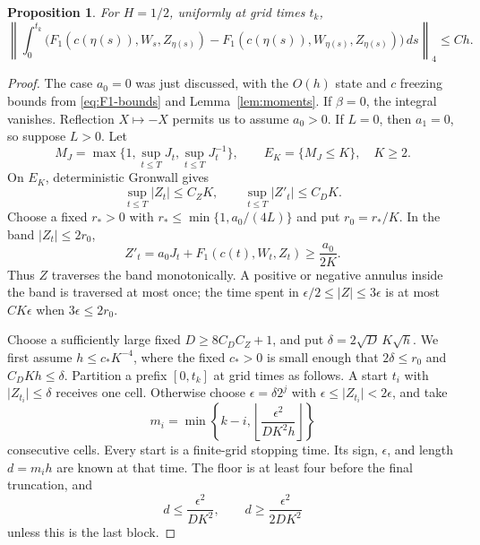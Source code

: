 \documentclass[11pt]{article}
\newtheorem{proposition}[theorem]{Proposition}
\theoremstyle{remark}
\newcommand{\abs}[1]{\lvert#1\rvert}
\begin{document}
\begin{proposition}\label{prop:Brownian-Q}
For \(H=1/2\), uniformly at grid times \(t_k\),
\begin{equation}\label{eq:Brownian-Q}
 \left\|\int_0^{t_k}
 \bigl(F_1(c(\eta(s)),W_s,Z_{\eta(s)})
       -F_1(c(\eta(s)),W_{\eta(s)},Z_{\eta(s)})\bigr)\,ds
 \right\|_4\le Ch .
\end{equation}
\end{proposition}
\begin{proof}
The case \(a_0=0\) was just discussed, with the \(O(h)\) state and
\(c\) freezing bounds from \eqref{eq:F1-bounds} and
Lemma~\ref{lem:moments}. If \(\beta=0\), the integral vanishes.
Reflection \(X\mapsto-X\) permits us to assume \(a_0>0\).
If \(L=0\), then \(a_1=0\), so suppose \(L>0\).
Let
\[
 M_J=\max\{1,\sup_{t\le T}J_t,\sup_{t\le T}J_t^{-1}\},
 \qquad E_K=\{M_J\le K\},\quad K\ge2.
\]
On \(E_K\), deterministic Gronwall gives
\begin{equation}\label{eq:localized-Z}
 \sup_{t\le T}\abs{Z_t}\le C_ZK,\qquad
 \sup_{t\le T}\abs{Z'_t}\le C_DK.
\end{equation}
Choose a fixed \(r_*>0\) with
\(r_*\le\min\{1,a_0/(4L)\}\) and put \(r_0=r_*/K\).
In the band \(\abs{Z_t}\le2r_0\),
\begin{equation}\label{eq:monotone-band}
 Z'_t=a_0J_t+F_1(c(t),W_t,Z_t)\ge\frac{a_0}{2K}.
\end{equation}
Thus \(Z\) traverses the band monotonically. A positive or negative
annulus inside the band is traversed at most once; the time spent
in \(\epsilon/2\le\abs Z\le3\epsilon\) is at most \(CK\epsilon\)
when \(3\epsilon\le2r_0\).

Choose a sufficiently large fixed \(D\ge8C_DC_Z+1\), and put
\(\delta=2\sqrt D\,K\sqrt h\).
We first assume \(h\le c_*K^{-4}\), where the fixed \(c_*>0\) is
small enough that \(2\delta\le r_0\) and \(C_DKh\le\delta\).
Partition a prefix \([0,t_k]\) at grid times as follows.
A start \(t_i\) with \(\abs{Z_{t_i}}\le\delta\) receives one cell.
Otherwise choose \(\epsilon=\delta2^j\) with
\(\epsilon\le\abs{Z_{t_i}}<2\epsilon\), and take
\begin{equation}\label{eq:block-length}
 m_i=\min\left\{k-i,\left\lfloor\frac{\epsilon^2}{DK^2h}
                         \right\rfloor\right\}
\end{equation}
consecutive cells. Every start is a finite-grid stopping time.
Its sign, \(\epsilon\), and length \(d=m_ih\) are known at that time.
The floor is at least four before the final truncation, and
\[
 d\le\frac{\epsilon^2}{DK^2},\qquad
 d\ge\frac{\epsilon^2}{2DK^2}
\]
unless this is the last block.


\end{proof}
\end{document}

